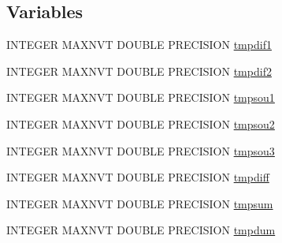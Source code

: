 \subsection*{Variables}
\begin{DoxyCompactItemize}
\item 
I\-N\-T\-E\-G\-E\-R M\-A\-X\-N\-V\-T D\-O\-U\-B\-L\-E P\-R\-E\-C\-I\-S\-I\-O\-N \hyperlink{home_2abonfi_2_c_f_d__codes_2_eul_f_s_83_84_2include_2tdebug_8com_a7d0989f9a38016617ca1bc61561d66ff}{tmpdif1}
\item 
I\-N\-T\-E\-G\-E\-R M\-A\-X\-N\-V\-T D\-O\-U\-B\-L\-E P\-R\-E\-C\-I\-S\-I\-O\-N \hyperlink{home_2abonfi_2_c_f_d__codes_2_eul_f_s_83_84_2include_2tdebug_8com_ab964a6f708f4f29204794080b9468323}{tmpdif2}
\item 
I\-N\-T\-E\-G\-E\-R M\-A\-X\-N\-V\-T D\-O\-U\-B\-L\-E P\-R\-E\-C\-I\-S\-I\-O\-N \hyperlink{home_2abonfi_2_c_f_d__codes_2_eul_f_s_83_84_2include_2tdebug_8com_a023b3a6f5da0440dce335a556cb89fe6}{tmpsou1}
\item 
I\-N\-T\-E\-G\-E\-R M\-A\-X\-N\-V\-T D\-O\-U\-B\-L\-E P\-R\-E\-C\-I\-S\-I\-O\-N \hyperlink{home_2abonfi_2_c_f_d__codes_2_eul_f_s_83_84_2include_2tdebug_8com_a7e31143aa010697a65a7ffe87ef242e7}{tmpsou2}
\item 
I\-N\-T\-E\-G\-E\-R M\-A\-X\-N\-V\-T D\-O\-U\-B\-L\-E P\-R\-E\-C\-I\-S\-I\-O\-N \hyperlink{home_2abonfi_2_c_f_d__codes_2_eul_f_s_83_84_2include_2tdebug_8com_aa8356e45fafae8344ea4ae9ccfe00326}{tmpsou3}
\item 
I\-N\-T\-E\-G\-E\-R M\-A\-X\-N\-V\-T D\-O\-U\-B\-L\-E P\-R\-E\-C\-I\-S\-I\-O\-N \hyperlink{home_2abonfi_2_c_f_d__codes_2_eul_f_s_83_84_2include_2tdebug_8com_a5fcc422c86549ee48051b12b4b0b9003}{tmpdiff}
\item 
I\-N\-T\-E\-G\-E\-R M\-A\-X\-N\-V\-T D\-O\-U\-B\-L\-E P\-R\-E\-C\-I\-S\-I\-O\-N \hyperlink{home_2abonfi_2_c_f_d__codes_2_eul_f_s_83_84_2include_2tdebug_8com_af2cc9aa6a0cb8a889362cdb7fc0977ea}{tmpsum}
\item 
I\-N\-T\-E\-G\-E\-R M\-A\-X\-N\-V\-T D\-O\-U\-B\-L\-E P\-R\-E\-C\-I\-S\-I\-O\-N \hyperlink{home_2abonfi_2_c_f_d__codes_2_eul_f_s_83_84_2include_2tdebug_8com_a85a53731c75ba4f8b2fb687cdcbe3f66}{tmpdum}
\end{DoxyCompactItemize}


